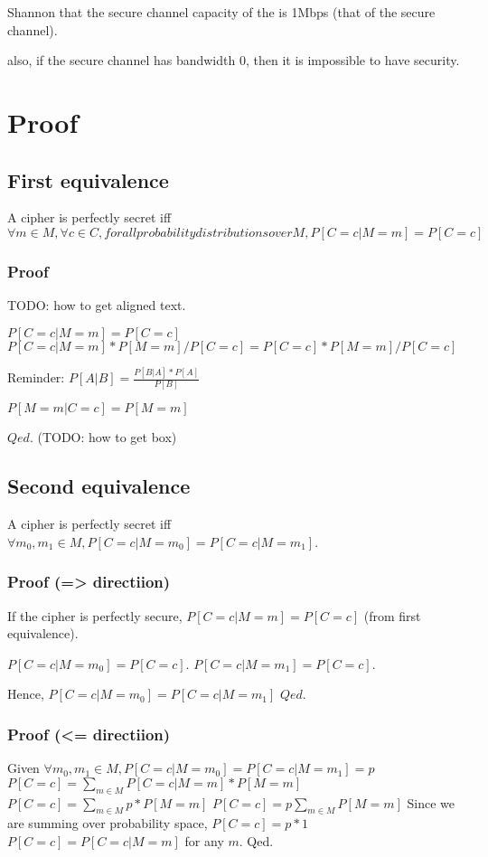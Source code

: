 Shannon  that the secure channel capacity of the  is 1Mbps (that of the secure channel).

also, if the secure channel has bandwidth 0, then it is impossible to have security.

\section{Proof}

\subsection{First equivalence}
A cipher is perfectly secret iff $\forall m \in M, \forall c \in C, forall probability distributions over M, P[C=c| M=m] = P[C=c]$

\subsubsection{Proof}
TODO: how to get aligned text.

 $P[C=c|M=m] = P[C=c]$
$P[C=c|M=m] * P[M=m] /P[C=c] = P[C=c] * P[M=m]/P[C=c]$

Reminder: $P[A|B] = \frac{P[B|A] * P[A]}{P[B]}$

$P[M=m|C=c] = P[M=m]$

$Qed.$ (TODO: how to get box)


\subsection{Second equivalence}
A cipher is perfectly secret iff $\forall m_0, m_1 \in M, P[C=c|M=m_0] = P[C=c|M=m_1]$.
\subsubsection{Proof (=> directiion)}

If the cipher is perfectly secure,
$P[C=c|M=m] = P[C=c]$  (from first equivalence).

$P[C=c|M=m_0] = P[C=c]$.
$P[C=c|M=m_1] = P[C=c]$.

Hence,
$P[C=c|M=m_0] = P[C=c|M=m_1]$
$Qed.$

\subsubsection{Proof (<= directiion)}
Given $\forall m_0, m_1 \in M, P[C=c|M=m_0] = P[C=c|M=m_1] = p$
$P[C=c] = \sum_{m \in M} P[C=c|M=m] * P[M=m]$
$P[C=c] = \sum_{m \in M} p * P[M=m]$
$P[C=c] = p \sum_{m \in M} P[M=m]$
Since we are summing over probability space,
$P[C=c] = p * 1$
$P[C=c] = P[C=c|M=m]$ for any $m$.
Qed.

